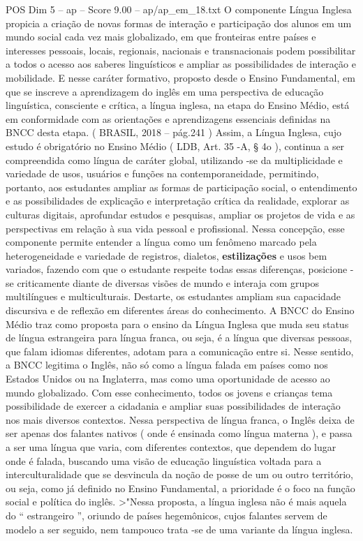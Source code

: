 \begin{textsample}{POS Dim 5 – ap – Score 9.00 – ap/ap\_em\_18.txt}
O componente Língua Inglesa propicia a criação de novas formas de interação e participação dos alunos em um mundo social cada vez mais globalizado, em que fronteiras entre países e interesses pessoais, locais, regionais, nacionais e transnacionais podem possibilitar a todos o acesso aos saberes linguísticos e ampliar as possibilidades de interação e mobilidade.
E nesse caráter formativo, proposto desde o Ensino Fundamental, em que se inscreve a aprendizagem do inglês em uma perspectiva de educação linguística, consciente e crítica, a língua inglesa, na etapa do Ensino Médio, está em conformidade com as orientações e aprendizagens essenciais definidas na BNCC desta etapa. ( BRASIL, 2018 – pág.241 ) Assim, a Língua Inglesa, cujo estudo é obrigatório no Ensino Médio ( LDB, Art. 35 -A, § 4o ), continua a ser compreendida como língua de caráter global, utilizando -se da multiplicidade e variedade de usos, usuários e funções na contemporaneidade, permitindo, portanto, aos estudantes ampliar as formas de participação social, o entendimento e as possibilidades de explicação e interpretação crítica da realidade, explorar as culturas digitais, aprofundar estudos e pesquisas, ampliar os projetos de vida e as perspectivas em relação à sua vida pessoal e profissional.
Nessa concepção, esse componente permite entender a língua como um fenômeno marcado pela heterogeneidade e variedade de registros, dialetos, \textbf{estilizações} e usos bem variados, fazendo com que o estudante respeite todas essas diferenças, posicione -se criticamente diante de diversas visões de mundo e interaja com grupos multilíngues e multiculturais.
Destarte, os estudantes ampliam sua capacidade discursiva e de reflexão em diferentes áreas do conhecimento.
A BNCC do Ensino Médio traz como proposta para o ensino da Língua Inglesa que muda seu status de língua estrangeira para língua franca, ou seja, é a língua que diversas pessoas, que falam idiomas diferentes, adotam para a comunicação entre si.
Nesse sentido, a BNCC legitima o Inglês, não só como a língua falada em países como nos Estados Unidos ou na Inglaterra, mas como uma oportunidade de acesso ao mundo globalizado.
Com esse conhecimento, todos os jovens e crianças tema possibilidade de exercer a cidadania e ampliar suas possibilidades de interação nos mais diversos contextos.
Nessa perspectiva de língua franca, o Inglês deixa de ser apenas dos falantes nativos ( onde é ensinada como língua materna ), e passa a ser uma língua que varia, com diferentes contextos, que dependem do lugar onde é falada, buscando uma visão de educação linguística voltada para a interculturalidade que se desvincula da noção de posse de um ou outro território, ou seja, como já definido no Ensino Fundamental, a prioridade é o foco na função social e política do inglês. >"Nessa proposta, a língua inglesa não é mais aquela do “ estrangeiro ”, oriundo de países hegemônicos, cujos falantes servem de modelo a ser seguido, nem tampouco trata -se de uma variante da língua inglesa.

\end{textsample}
